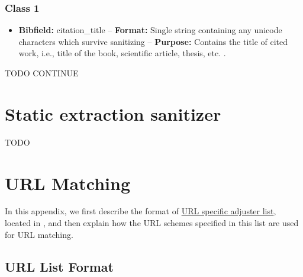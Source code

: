 \documentclass[
a4paper,
12pt,
]
{article}
\begin{document}
 \subsubsection{Class 1}
 \begin{itemize}
  \item \textbf{Bibfield:} citation\_title -- \textbf{Format:} Single string containing any unicode characters which survive sanitizing -- \textbf{Purpose:} Contains the title of cited work, i.e., title of the book, scientific article, thesis, etc. .
 \end{itemize}

 TODO CONTINUE
 
 \section{Static extraction sanitizer}\label{app_sanitize}
 
 TODO
 
 \section{URL Matching}\label{app_matching}
 
 In this appendix, we first describe the format of \href{https://github.com/Langenscheiss/bibitnow/blob/master/nameResources/urlSpecificAdjusterList.json}{URL specific adjuster list}, located in
 , 
 and then explain how the URL schemes specified in this list are used for URL matching.
 
 \subsection{URL List Format}\label{app_matching_list}
 
\end{document}
